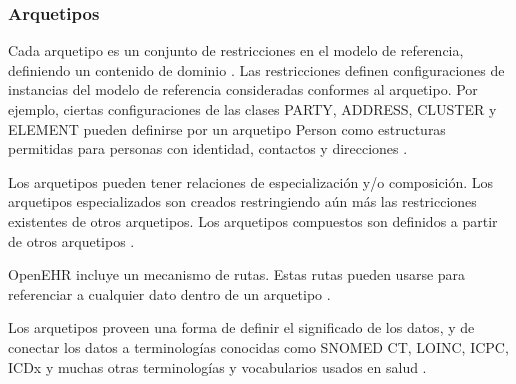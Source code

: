\subsubsection{Arquetipos}

Cada arquetipo es un conjunto de restricciones en el modelo de referencia, definiendo un contenido de dominio \cite{openEHRArchitecture}. Las restricciones definen configuraciones de instancias del modelo de referencia consideradas conformes al arquetipo. Por ejemplo, ciertas configuraciones de las clases PARTY, ADDRESS, CLUSTER y ELEMENT pueden definirse por un arquetipo Person como estructuras permitidas para personas con identidad, contactos y direcciones \cite{openEHRAOM}.

Los arquetipos pueden tener relaciones de especialización y/o composición. Los arquetipos especializados son creados restringiendo aún más las restricciones existentes de otros arquetipos. Los arquetipos compuestos son definidos a partir de otros arquetipos \cite{openEHRArchitecture}.

OpenEHR incluye un mecanismo de rutas. Estas rutas pueden usarse para referenciar a cualquier dato dentro de un arquetipo \cite{openEHRArchitecture}.

Los arquetipos proveen una forma de definir el significado de los datos, y de conectar los datos a terminologías conocidas como SNOMED CT, LOINC, ICPC, ICDx y muchas otras terminologías y vocabularios usados en salud \cite{openEHRArchitecture}.
